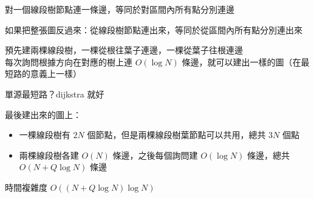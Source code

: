 \begin{frame}{\ectitle}
{\begin{figure}[h!]
\begin{center}
        \end{center}
    \end{figure}
    }
\end{frame}

\begin{frame}{\ectitle}
    對一個線段樹節點連一條邊，等同於對區間內所有點分別連邊
    
    如果把整張圖反過來：從線段樹節點連出來，等同於從區間內所有點分別連出來
\end{frame}

\begin{frame}{\ectitle}
    預先建兩棵線段樹，一棵從根往葉子連邊，一棵從葉子往根連邊 \\
    每次詢問根據方向在對應的樹上連 $O(\log N)$ 條邊，就可以建出一樣的圖（在最短路的意義上一樣）

    單源最短路？dijkstra 就好
\end{frame}

\begin{frame}{\ectitle}
    最後建出來的圖上：
    \begin{itemize}
        \item 一棵線段樹有 $2N$ 個節點，但是兩棵線段樹葉節點可以共用，總共 $3N$ 個點
        \item 兩棵線段樹各建 $O(N)$ 條邊，之後每個詢問建 $O(\log N)$ 條邊，總共 $O(N + Q \log N)$ 條邊
    \end{itemize}
    時間複雜度 $O((N + Q \log N) \log N)$
\end{frame}

